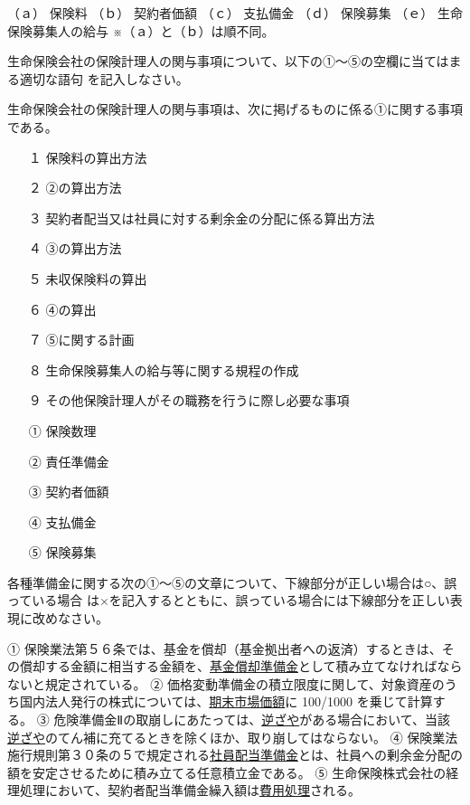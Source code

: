 \documentclass[report,gutter=10mm,fore-edge=10mm,uplatex,dvipdfmx]{jlreq}
\begin{document}
\answer{}
（ａ） 保険料 （ｂ） 契約者価額
（ｃ） 支払備金 （ｄ） 保険募集
（ｅ） 生命保険募集人の給与
※（ａ）と（ｂ）は順不同。


生命保険会社の保険計理人の関与事項について、以下の①～⑤の空欄に当てはまる適切な語句
を記入しなさい。

生命保険会社の保険計理人の関与事項は、次に掲げるものに係る①に関する事項である。

\begin{itemize}
\item[ １]  保険料の算出方法
\item[ ２]  ②の算出方法
\item[ ３]  契約者配当又は社員に対する剰余金の分配に係る算出方法
\item[ ４]  ③の算出方法
\item[ ５]  未収保険料の算出
\item[ ６]  ④の算出
\item[ ７]  ⑤に関する計画
\item[ ８]  生命保険募集人の給与等に関する規程の作成
\item[ ９]  その他保険計理人がその職務を行うに際し必要な事項
\end{itemize}
\answer{}
\begin{itemize}
\item[ ① ] 保険数理
\item[ ② ] 責任準備金
\item[ ③ ] 契約者価額
\item[ ④ ] 支払備金
\item[ ⑤ ] 保険募集
\end{itemize}


各種準備金に関する次の①～⑤の文章について、下線部分が正しい場合は○、誤っている場合
は×を記入するとともに、誤っている場合には下線部分を正しい表現に改めなさい。

① 保険業法第５６条では、基金を償却（基金拠出者への返済）するときは、その償却する金額に相当する金額を、\underline{基金償却準備金}として積み立てなければならないと規定されている。
② 価格変動準備金の積立限度に関して、対象資産のうち国内法人発行の株式については、\underline{期末市場価額}に 100/1000 を乗じて計算する。
③ 危険準備金Ⅱの取崩しにあたっては、\underline{逆ざや}がある場合において、当該\underline{逆ざや}のてん補に充てるときを除くほか、取り崩してはならない。
④ 保険業法施行規則第３０条の５で規定される\underline{社員配当準備金}とは、社員への剰余金分配の額を安定させるために積み立てる任意積立金である。
⑤ 生命保険株式会社の経理処理において、契約者配当準備金繰入額は\underline{費用処理}される。
\end{document}
